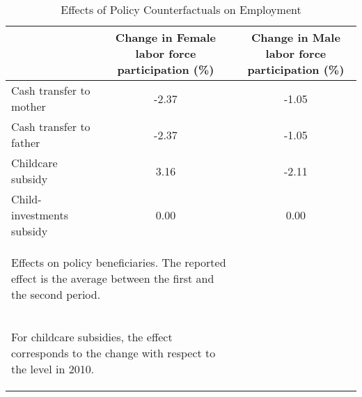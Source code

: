 \begin{table}[H]
\centering
\begingroup\footnotesize
\begin{tabular}{lcc}
  \hline
 & Change in Female labor force participation (\%) & Change in Male labor force participation (\%) \\ 
  \hline
Cash transfer to mother & -2.37 & -1.05 \\ 
  Cash transfer to father & -2.37 & -1.05 \\ 
  Childcare subsidy & 3.16 & -2.11 \\ 
  Child-investments subsidy & 0.00 & 0.00 \\ 
   \hline 
\multicolumn{2}{l}{ \begin{tiny} Effects on policy beneficiaries. The reported effect is the average between the first and the second period.\end{tiny}   }\\ 
\multicolumn{2}{l}{\begin{tiny} For childcare subsidies, the effect corresponds to the change with respect to the level in 2010. \end{tiny}} 
\end{tabular}
\endgroup
\caption{Effects of Policy Counterfactuals on Employment} 
\label{tab:TablePolicychangeR1}
\end{table}

